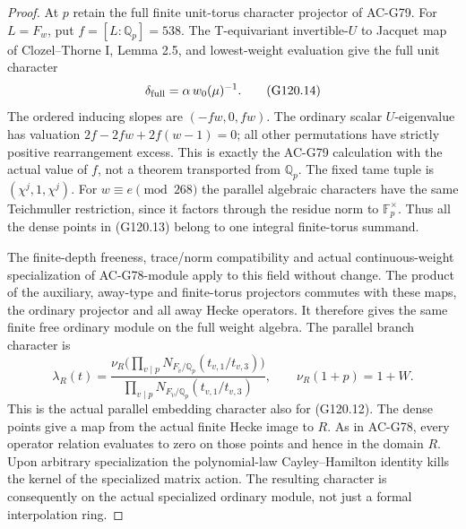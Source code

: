 \begin{proof}
At $p$ retain the full finite unit-torus character projector
of AC-G79.  For $L=F_w$, put $f=[L:\mathbb Q_p]=538$.
The T-equivariant invertible-$U$ to Jacquet map of
Clozel--Thorne I, Lemma 2.5, and lowest-weight evaluation give
the full unit character
\[
          \delta_{\rm full}=\alpha\,w_0(\mu)^{-1}.
                                                                    \tag{G120.14}
\]
The ordered inducing slopes are $(-fw,0,fw)$.
The ordinary scalar $U$-eigenvalue has valuation
$2f-2fw+2f(w-1)=0$; all other permutations have strictly
positive rearrangement excess.  This is exactly the AC-G79
calculation with the actual value of $f$, not a theorem
transported from $\mathbb Q_p$.
The fixed tame tuple is $(\chi^j,1,\chi^j)$.
For $w\equiv e\pmod{268}$ the parallel algebraic characters
have the same Teichmuller restriction, since it factors through
the residue norm to $\mathbb F_p^\times$.
Thus all the dense points in (G120.13) belong to one integral
finite-torus summand.

The finite-depth freeness, trace/norm compatibility and actual
continuous-weight specialization of AC-G78-module apply to
this field without change.  The product of the auxiliary,
away-type and finite-torus projectors commutes with these
maps, the ordinary projector and all away Hecke operators.
It therefore gives the same finite free ordinary module on
the full weight algebra.  The parallel branch character is
\[
 \lambda_R(t)=
 \frac{\nu_R\bigl(\prod_{v\mid p}N_{F_{\widetilde v}/\mathbb Q_p}
                         (t_{v,1}/t_{v,3})\bigr)}
      {\prod_{v\mid p}N_{F_{\widetilde v}/\mathbb Q_p}
                         (t_{v,1}/t_{v,3})},\qquad \nu_R(1+p)=1+W.
                                                                    \tag{G120.15}
\]
This is the actual parallel embedding character also for (G120.12).
The dense points give a map from the actual finite Hecke image
to $R$.  As in AC-G78, every operator relation evaluates to zero
on those points and hence in the domain $R$.
Upon arbitrary specialization the polynomial-law Cayley--Hamilton
identity kills the kernel of the specialized matrix action.
The resulting character is consequently on the actual specialized
ordinary module, not just a formal interpolation ring.


\end{proof}
